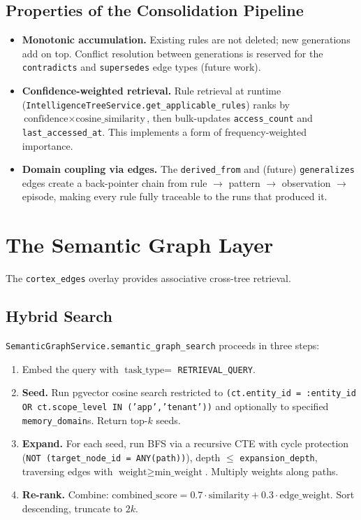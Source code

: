 \documentclass[11pt,a4paper]{article}
\theoremstyle{cortexprop}
\newcommand{\code}[1]{\texttt{#1}}
\begin{document}
\subsection{Properties of the Consolidation Pipeline}

\begin{itemize}
  \item \textbf{Monotonic accumulation.} Existing rules are not deleted;
  new generations add on top. Conflict resolution between generations is
  reserved for the \code{contradicts} and \code{supersedes} edge types
  (future work).

  \item \textbf{Confidence-weighted retrieval.} Rule retrieval at runtime
  (\code{IntelligenceTreeService.get\_applicable\_rules}) ranks by
  $\text{confidence} \times \text{cosine\_similarity}$, then bulk-updates
  \code{access\_count} and \code{last\_accessed\_at}. This implements a
  form of frequency-weighted importance.

  \item \textbf{Domain coupling via edges.} The \code{derived\_from} and
  (future) \code{generalizes} edges create a back-pointer chain from
  rule $\to$ pattern $\to$ observation $\to$ episode, making every rule
  fully traceable to the runs that produced it.
\end{itemize}

\section{The Semantic Graph Layer}
\label{sec:graph}

The \code{cortex\_edges} overlay provides associative cross-tree retrieval.

\subsection{Hybrid Search}

\code{SemanticGraphService.semantic\_graph\_search} proceeds in three
steps:

\begin{enumerate}
  \item Embed the query with $\text{task\_type} = $ \code{RETRIEVAL\_QUERY}.
  \item \textbf{Seed.} Run pgvector cosine search restricted to
  \code{(ct.entity\_id = :entity\_id OR ct.scope\_level IN ('app','tenant'))}
  and optionally to specified \code{memory\_domain}s. Return top-$k$
  seeds.
  \item \textbf{Expand.} For each seed, run BFS via a recursive CTE with
  cycle protection (\code{NOT (target\_node\_id = ANY(path))}), depth
  $\leq$ \code{expansion\_depth}, traversing edges with $\text{weight}
  \geq \text{min\_weight}$. Multiply weights along paths.
  \item \textbf{Re-rank.} Combine:
  $\text{combined\_score} = 0.7 \cdot \text{similarity}
  + 0.3 \cdot \text{edge\_weight}$. Sort descending, truncate to
  $2k$.
\end{enumerate}
\end{document}

